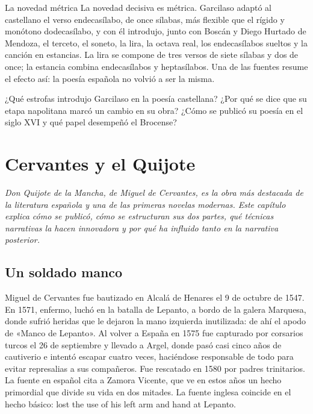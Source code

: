 \documentclass{book}
\begin{document}
\begin{tcolorbox}[title={Autoficha}, studiumcheck, breakable]

La novedad métrica
La novedad decisiva es métrica. Garcilaso adaptó al castellano el verso endecasílabo, de once sílabas, más flexible que el rígido y monótono dodecasílabo, y con él introdujo, junto con Boscán y Diego Hurtado de Mendoza, el terceto, el soneto, la lira, la octava real, los endecasílabos sueltos y la canción en estancias. La lira se compone de tres versos de siete sílabas y dos de once; la estancia combina endecasílabos y heptasílabos. Una de las fuentes resume el efecto así: la poesía española no volvió a ser la misma.


¿Qué estrofas introdujo Garcilaso en la poesía castellana? ¿Por qué se dice que su etapa napolitana marcó un cambio en su obra? ¿Cómo se publicó su poesía en el siglo XVI y qué papel desempeñó el Brocense?

\end{tcolorbox}

\chapter{Cervantes y el Quijote}
\label{chap:lit-06}

\noindent\textit{Don Quijote de la Mancha, de Miguel de Cervantes, es la obra más destacada de la literatura española y una de las primeras novelas modernas. Este capítulo explica cómo se publicó, cómo se estructuran sus dos partes, qué técnicas narrativas la hacen innovadora y por qué ha influido tanto en la narrativa posterior.}


\section{Un soldado manco}

Miguel de Cervantes fue bautizado en Alcalá de Henares el 9 de octubre de 1547. En 1571, enfermo, luchó en la batalla de Lepanto, a bordo de la galera Marquesa, donde sufrió heridas que le dejaron la mano izquierda inutilizada: de ahí el apodo de «Manco de Lepanto». Al volver a España en 1575 fue capturado por corsarios turcos el 26 de septiembre y llevado a Argel, donde pasó casi cinco años de cautiverio e intentó escapar cuatro veces, haciéndose responsable de todo para evitar represalias a sus compañeros. Fue rescatado en 1580 por padres trinitarios. La fuente en español cita a Zamora Vicente, que ve en estos años un hecho primordial que divide su vida en dos mitades. La fuente inglesa coincide en el hecho básico: lost the use of his left arm and hand at Lepanto.
\end{document}
